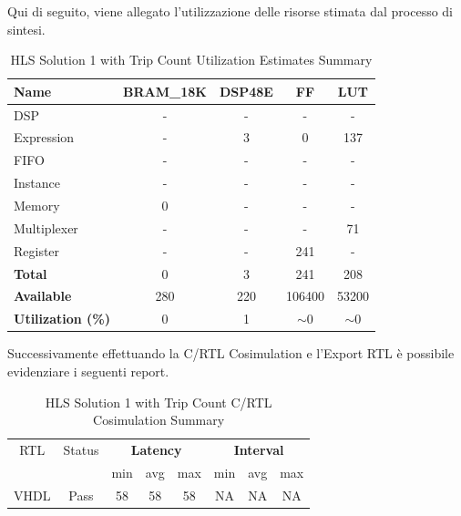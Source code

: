Qui di seguito, viene allegato l'utilizzazione delle risorse stimata dal processo di sintesi.
\begin{table}[h]
	\centering
	\begin{tabular}{|l|c|c|c|c|}
		\hline
		\textbf{Name}    & \textbf{BRAM\_18K} & \textbf{DSP48E} & \textbf{FF} & \textbf{LUT} \\ \hline
		DSP              & -                   & -               & -           & -            \\ 
		Expression       & -                   & 3               & 0           & 137          \\ 
		FIFO             & -                   & -               & -           & -            \\ 
		Instance         & -                   & -               & -           & -            \\ 
		Memory           & 0                   & -               & -          & -            \\ 
		Multiplexer      & -                   & -               & -           & 71          \\ 
		Register         & -                   & -               & 241         & -            \\ \hline
		\textbf{Total}   & 0                   & 3               & 241         & 208          \\ \hline
		\textbf{Available} & 280               & 220             & 106400      & 53200        \\ \hline
		\textbf{Utilization (\%)} & 0            & 1               & $\sim$0     & $\sim$0      \\ \hline
	\end{tabular}
	\caption{HLS Solution 1 with Trip Count Utilization Estimates Summary}
	\label{tab:hls-solution-1-utilization-estimates-summary}
\end{table}

Successivamente effettuando la C/RTL Cosimulation e l'Export RTL è possibile evidenziare i seguenti report.
\begin{table}[H]
	\centering
	\begin{tabular}{|c|c|c|c|c|c|c|c|}
		\hline
		\multicolumn{1}{|c|}{RTL} & \multicolumn{1}{|c|}{Status} & \multicolumn{3}{c|}{\textbf{Latency}} & \multicolumn{3}{c|}{\textbf{Interval}} \\
		&  & min & avg & max & min & avg & max \\
		\hline
		VHDL & Pass & 58 & 58 & 58 & NA & NA & NA \\
		\hline
	\end{tabular}
	\caption{HLS Solution 1 with Trip Count C/RTL Cosimulation Summary }
	\label{tab:hls-solution-1-cosimulation-summary}
\end{table}

